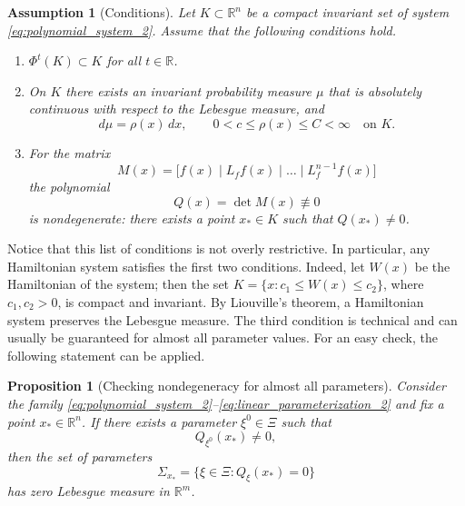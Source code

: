 \documentclass[10pt,a4paper]{amsart}
\newcommand{\R}{\mathbb{R}}
\newcommand{\dd}{\,d}
\newtheorem{proposition}[theorem]{Proposition}
\newtheorem{assumption}[theorem]{Assumption}
\begin{document}
\begin{assumption}[Conditions]
\label{ass:main_2}
Let $K\subset\R^n$ be a compact invariant set of system \eqref{eq:polynomial_system_2}. Assume that the following conditions hold.
\begin{enumerate}[label=(A\arabic*)]
    \item $\Phi^t(K) \subset K$ for all $t\in\R$.
    \item On $K$ there exists an invariant probability measure $\mu$ that is absolutely continuous with respect to the Lebesgue measure, and
    \[
        d\mu=\rho(x)\dd x,
        \qquad
        0<c\le \rho(x)\le C<\infty
        \quad \text{on }K.
    \]
    \item For the matrix
    \[
        M(x)=\bigl[f(x)\mid L_f f(x)\mid\dots\mid L_f^{n-1}f(x)\bigr]
    \]
    the polynomial
    \[
        Q(x)=\det M(x) \not\equiv 0
    \]
    is nondegenerate: there exists a point $x_*\in K$ such that $Q(x_*)\ne0$.
\end{enumerate}
\end{assumption}

Notice that this list of conditions is not overly restrictive. In particular, any Hamiltonian system satisfies the first two conditions. Indeed, let $W(x)$ be the Hamiltonian of the system; then the set $K = \{x:c_1\le W(x) \le c_2\}$, where $c_1,c_2 > 0$, is compact and invariant. By Liouville's theorem, a Hamiltonian system preserves the Lebesgue measure. The third condition is technical and can usually be guaranteed for almost all parameter values. For an easy check, the following statement can be applied.

\begin{proposition}[Checking nondegeneracy for almost all parameters]
\label{prop:param_nondegeneracy_2}
Consider the family \eqref{eq:polynomial_system_2}--\eqref{eq:linear_parameterization_2} and fix a point $x_*\in\R^n$. If there exists a parameter $\xi^0\in\Xi$ such that
\[
    Q_{\xi^0}(x_*)\ne0,
\]
then the set of parameters
\[
    \Sigma_{x_*}=\{\xi\in\Xi:Q_\xi(x_*)=0\}
\]
has zero Lebesgue measure in $\R^m$.
\end{proposition}
\end{document}
